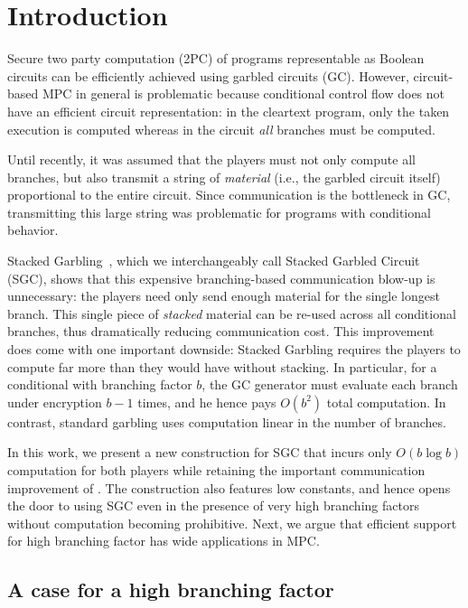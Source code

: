 \section{Introduction}\label{sec:intro}

Secure two party computation (2PC) of programs representable as Boolean circuits can be efficiently achieved using garbled circuits (GC).
%
However,  circuit-based MPC in general is problematic because conditional
control flow does not have an efficient circuit representation:
in the cleartext program, only the taken execution is computed whereas in
the circuit \emph{all} branches must be computed.

%
Until recently, it was assumed that the players must not only compute
all branches, but also transmit a string of \emph{material} (i.e., the garbled circuit itself) 
proportional to the entire circuit.  
Since communication is the bottleneck in GC, transmitting this large string was
problematic for programs with conditional behavior.

Stacked Garbling~\HK, which we %
interchangeably call Stacked Garbled Circuit (SGC), shows that
this expensive branching-based communication blow-up is unnecessary: the players need only
send enough material for the single longest branch. This single
piece of \emph{stacked} material can be re-used across all conditional branches, thus
dramatically reducing communication cost.
%
This improvement does come with one important downside:
Stacked Garbling requires the players to compute far more than they
would have without stacking.
In particular, for a conditional with branching factor $b$, the \HK GC
generator must evaluate each branch under encryption $b-1$ times, and
he hence pays $O(b^2)$ total computation.
In contrast, standard garbling uses computation linear in the number
of branches.

In this work, we present a new construction for SGC that incurs
only $O(b \log b)$ computation for both players while
retaining the important communication improvement of \HK.
%
The construction also features low constants, and hence opens the door
to using SGC even in the presence of very high branching factors
without computation becoming prohibitive.  Next, we argue that efficient  support for high branching factor has wide applications in MPC.


\subsection{A case for a high branching factor}
\label{sec:motivationHighB}

